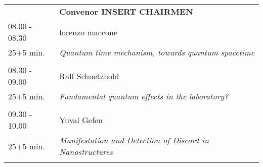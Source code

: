 \begin{longtable}{p{3cm}p{13cm}}
&\hfill {\bf Convenor INSERT CHAIRMEN }\\ 
08.00 - 08.30 & lorenzo maccone\\ 
25+5 min. & {\it Quantum time mechanism, towards quantum spacetime}\\ 
 & \\ 
08.30 - 09.00 & Ralf Schuetzhold\\ 
25+5 min. & {\it Fundamental quantum effects in the laboratory?}\\ 
 & \\ 
09.30 - 10.00 & Yuval Gefen\\ 
25+5 min. & {\it Manifestation and Detection of Discord in Nanostructures}\\ 
 & \\ 
\end{longtable}

